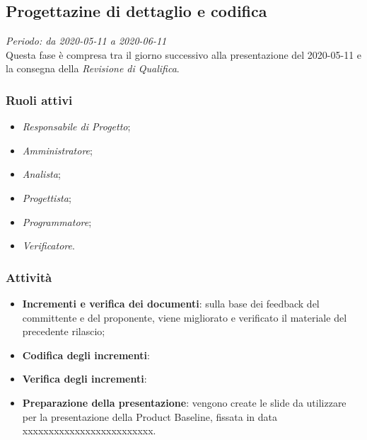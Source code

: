 \subsection{Progettazine di dettaglio e codifica}
\textit{Periodo: da 2020-05-11 a 2020-06-11}\\
Questa fase è compresa tra il giorno successivo alla presentazione del 2020-05-11 e la consegna della \textit{Revisione di Qualifica}.

\subsubsection{Ruoli attivi} \begin{itemize}
\item \textit{Responsabile di Progetto};
\item \textit{Amministratore};
\item \textit{Analista};
\item \textit{Progettista};
\item \textit{Programmatore};
\item \textit{Verificatore}.
\end{itemize}

\subsubsection{Attività}
\begin{itemize}
\item \textbf{Incrementi e verifica dei documenti}: sulla base dei feedback del committente e del proponente, viene migliorato e verificato il materiale del precedente rilascio;
\item \textbf{Codifica degli incrementi}: 
\item \textbf{Verifica degli incrementi}: 
\item \textbf{Preparazione della presentazione}: vengono create le slide da utilizzare per la presentazione della Product Baseline, fissata in data xxxxxxxxxxxxxxxxxxxxxxxxx.
\end{itemize}

